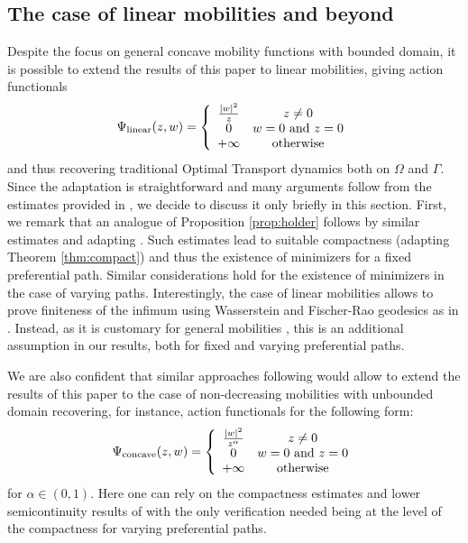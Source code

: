 \documentclass{article}
\begin{document}
\subsection{The case of linear mobilities and beyond}\label{LinMobilities}

Despite the focus on general concave mobility functions with bounded domain, it is possible to extend the results of this paper to linear mobilities, giving action functionals 
\begin{align}
    \Psi_{\rm linear}(z,w) = \left\{
    \begin{array}{cc}
         \frac{|w|^2}{z}& z \neq 0  \\
         0 & w = 0 \text{ and } z = 0\\
         +\infty &  \text{ otherwise } 
    \end{array}
    \right.
\end{align}
and thus recovering traditional Optimal Transport dynamics both on $\Omega$ and $\Gamma$. Since the adaptation is straightforward and many arguments follow from the estimates provided in \cite{monsaingeon2021new}, we decide to discuss it only briefly in this section.
First, we remark that an analogue of Proposition \ref{prop:holder} follows by similar estimates and adapting \cite[Proposition 3.5]{monsaingeon2021new}. Such estimates lead to suitable compactness (adapting Theorem \ref{thm:compact}) and thus the existence of minimizers for a fixed preferential path.
Similar considerations hold for the existence of minimizers in the case of varying paths. 
Interestingly, the case of linear mobilities allows to prove finiteness of the infimum using Wasserstein and Fischer-Rao geodesics as in \cite[Lemma 3.7]{monsaingeon2021new}. Instead, as it is customary for general mobilities \cite{Lisini2010}, this is an additional assumption in our results, both for fixed and varying preferential paths.

We are also confident that similar approaches following \cite{Dolbeault_2008, Carrillo2010} would allow to extend the results of this paper to the case of non-decreasing mobilities with unbounded domain recovering, for instance, action functionals for the following form:
\begin{align}
    \Psi_{\rm concave}(z,w) = \left\{
    \begin{array}{cc}
         \frac{|w|^2}{z^\alpha}& z \neq 0  \\
         0 & w = 0 \text{ and } z = 0\\
         +\infty &  \text{ otherwise } 
    \end{array}
    \right.
\end{align}
for $\alpha \in (0,1)$. Here one can rely on the compactness estimates and lower semicontinuity results of \cite{Dolbeault_2008} with the only verification needed being at the level of the compactness for varying preferential paths.  
\end{document}
